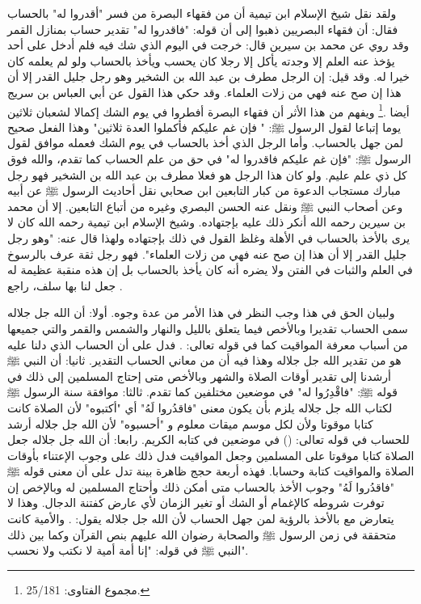ولقد نقل شيخ الإسلام ابن تيمية أن من فقهاء البصرة من فسر "أقدروا له" بالحساب فقال: أن فقهاء البصريين ذهبوا إلى أن قوله: "فاقدروا له" تقدير حساب بمنازل القمر وقد روي عن محمد بن سيرين قال: خرجت في اليوم الذي شك فيه فلم أدخل على أحد يؤخذ عنه العلم إلا وجدته يأكل إلا رجلا كان يحسب ويأخذ بالحساب ولو لم يعلمه كان خيرا له. وقد قيل: إن الرجل مطرف بن عبد الله بن الشخير وهو رجل جليل القدر إلا أن هذا إن صح عنه فهي من زلات العلماء. وقد حكي هذا القول عن أبي العباس بن سريج أيضا \href{https://shamela.ws/book/7289/12629#p1}{\faExternalLink} \cite{muslim}.\footnote{مجموع الفتاوى: 25/181.} ويفهم من هذا الأثر أن فقهاء البصرة أفطروا في يوم الشك إكمالا لشعبان ثلاثين يوما إتباعا لقول الرسول ﷺ: " فإن غم عليكم فأكملوا العدة ثلاثين" وهذا الفعل صحيح لمن جهل بالحساب. وأما الرجل الذي أخذ بالحساب في يوم الشك فعمله موافق لقول الرسول ﷺ: "فإن غم عليكم فاقدروا له" في حق من علم الحساب كما تقدم، والله فوق كل ذي علم عليم. ولو كان هذا الرجل هو فعلا مطرف بن عبد الله بن الشخير فهو رجل مبارك مستجاب الدعوة من كبار التابعين ابن صحابي نقل أحاديث الرسول ﷺ عن أبيه وعن أصحاب النبي ﷺ ونقل عنه الحسن البصري وغيره من أتباع التابعين. إلا أن محمد بن سيرين رحمه الله أنكر ذلك عليه بإجتهاده. وشيخ الإسلام ابن تيمية رحمه الله كان لا يرى بالأخذ بالحساب في الأهلة وغلظ القول في ذلك بإجتهاده ولهذا قال عنه: "وهو رجل جليل القدر إلا أن هذا إن صح عنه فهي من زلات العلماء". فهو رجل ثقة عرف بالرسوخ في العلم والثبات في الفتن ولا يضره أنه كان يأخذ بالحساب بل إن هذه منقبة عظيمة له جعل لنا بها سلف، راجع .

ولبيان الحق في هذا وجب النظر في هذا الأمر من عدة وجوه. أولا: أن الله جل جلاله سمى الحساب تقديرا وبالأخص فيما يتعلق بالليل والنهار والشمس والقمر والتي جميعها من أسباب معرفة المواقيت كما في قوله تعالى: \quranayah*[6][96] {\footnotesize (\surahname*[6])}. فدل على أن الحساب الذي دلنا عليه هو من تقدير الله جل جلاله وهذا فيه أن من معاني الحساب التقدير. ثانيا: أن النبي ﷺ أرشدنا إلى تقدير أوقات الصلاة والشهر وبالأخص متى إحتاج المسلمين إلى ذلك في قوله ﷺ: "فاقْدِرُوا له" في موضعين مختلفين كما تقدم. ثالثا: موافقة سنة الرسول ﷺ لكتاب الله جل جلاله يلزم بأن يكون معنى "فاقدُروا لَهُ" أي "أكتبوه" لأن الصلاة كانت كتابا موقوتا ولأن لكل موسم ميقات معلوم و "أحسبوه" لأن الله جل جلاله أرشد للحساب في قوله تعالى: (\quranayah*[10][5][10-13]) في موضعين في كتابه الكريم. رابعا: أن الله جل جلاله جعل الصلاة كتابا موقوتا على المسلمين وجعل المواقيت فدل ذلك على وجوب الإعتناء بأوقات الصلاة والمواقيت كتابة وحسابا. فهذه أربعة حجج ظاهرة بينة تدل على أن معنى قوله ﷺ "فاقدُروا لَهُ" وجوب الأخذ بالحساب  متى أمكن ذلك وأحتاج المسلمين له وبالإخص إن توفرت شروطه كالإغمام أو الشك أو تغير الزمان لأي عارض كفتنة الدجال. وهذا لا يتعارض مع بالأخذ بالرؤية لمن جهل الحساب لأن الله جل جلاله يقول: \quranayah*[22][78][8-14] {\footnotesize (\surahname*[22])}. والأمية كانت متحققة في زمن الرسول ﷺ والصحابة رضوان الله عليهم بنص القرآن وكما بين ذلك النبي ﷺ في قوله: "إنا أمة أمية لا نكتب ولا نحسب". 

